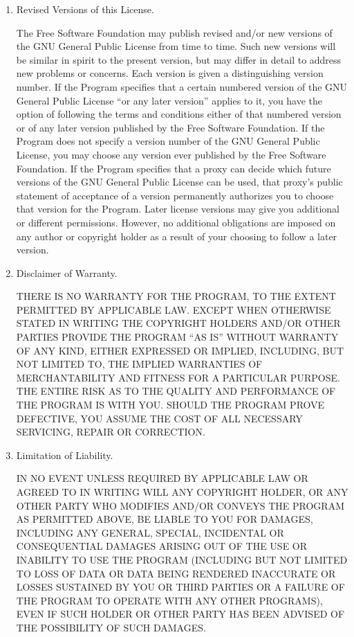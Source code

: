 \documentclass{article}
\begin{document}
\begin{enumerate}[\hspace{-18pt}1.]
\item Revised Versions of this License.

The Free Software Foundation may publish revised and/or new versions of the GNU General Public License from time to time.  Such new versions will be similar in spirit to the present version, but may differ in detail to address new problems or concerns.
Each version is given a distinguishing version number.  If the Program specifies that a certain numbered version of the GNU General Public License ``or any later version'' applies to it, you have the option of following the terms and conditions either of that numbered version or of any later version published by the Free Software Foundation.  If the Program does not specify a version number of the GNU General Public License, you may choose any version ever published by the Free Software Foundation.
If the Program specifies that a proxy can decide which future versions of the GNU General Public License can be used, that proxy's public statement of acceptance of a version permanently authorizes you to choose that version for the Program.
Later license versions may give you additional or different permissions.  However, no additional obligations are imposed on any author or copyright holder as a result of your choosing to follow a later version.

\item Disclaimer of Warranty.

\begin{sloppypar}  THERE IS NO WARRANTY FOR THE PROGRAM, TO THE EXTENT PERMITTED BY  APPLICABLE LAW.  EXCEPT WHEN OTHERWISE STATED IN WRITING THE  COPYRIGHT HOLDERS AND/OR OTHER PARTIES PROVIDE THE PROGRAM ``AS IS''  WITHOUT WARRANTY OF ANY KIND, EITHER EXPRESSED OR IMPLIED,  INCLUDING, BUT NOT LIMITED TO, THE IMPLIED WARRANTIES OF  MERCHANTABILITY AND FITNESS FOR A PARTICULAR PURPOSE.  THE ENTIRE  RISK AS TO THE QUALITY AND PERFORMANCE OF THE PROGRAM IS WITH YOU.  SHOULD THE PROGRAM PROVE DEFECTIVE, YOU ASSUME THE COST OF ALL  NECESSARY SERVICING, REPAIR OR CORRECTION. \end{sloppypar}

\item Limitation of Liability.

IN NO EVENT UNLESS REQUIRED BY APPLICABLE LAW OR AGREED TO IN  WRITING WILL ANY COPYRIGHT HOLDER, OR ANY OTHER PARTY WHO MODIFIES  AND/OR CONVEYS THE PROGRAM AS PERMITTED ABOVE, BE LIABLE TO YOU FOR  DAMAGES, INCLUDING ANY GENERAL, SPECIAL, INCIDENTAL OR CONSEQUENTIAL  DAMAGES ARISING OUT OF THE USE OR INABILITY TO USE THE PROGRAM  (INCLUDING BUT NOT LIMITED TO LOSS OF DATA OR DATA BEING RENDERED  INACCURATE OR LOSSES SUSTAINED BY YOU OR THIRD PARTIES OR A FAILURE  OF THE PROGRAM TO OPERATE WITH ANY OTHER PROGRAMS), EVEN IF SUCH  HOLDER OR OTHER PARTY HAS BEEN ADVISED OF THE POSSIBILITY OF SUCH  DAMAGES.


\end{enumerate}
\end{document}
